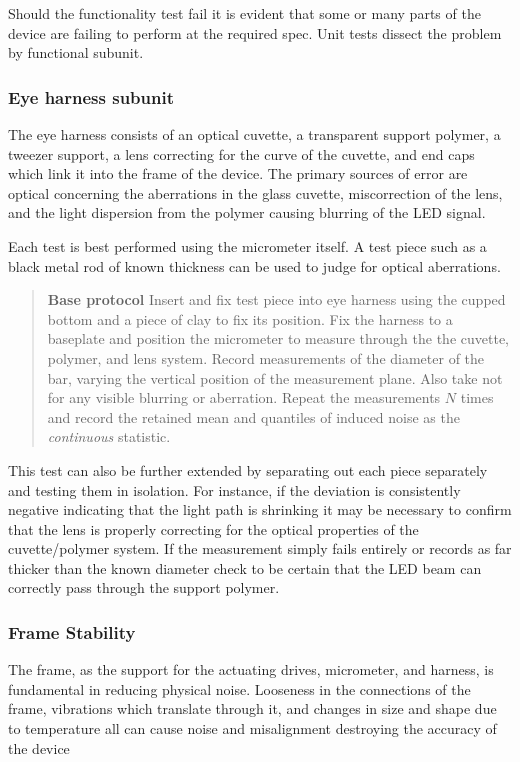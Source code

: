 \documentclass{article}
\begin{document}
Should the functionality test fail it is evident that some or many parts of the device are failing to perform at the required spec. Unit tests dissect the problem by functional subunit.


\subsubsection{Eye harness subunit}
The eye harness consists of an optical cuvette, a transparent support polymer, a tweezer support, a lens correcting for the curve of the cuvette, and end caps which link it into the frame of the device. The primary sources of error are optical concerning the aberrations in the glass cuvette, miscorrection of the lens, and the light dispersion from the polymer causing blurring of the LED signal.

Each test is best performed using the micrometer itself. A test piece such as a black metal rod of known thickness can be used to judge for optical aberrations.

\begin{quotation}
  \textbf{Base protocol} Insert and fix test piece into eye harness   using the cupped bottom and a piece of clay to fix its position. Fix   the harness to a baseplate and position the micrometer to measure   through the the cuvette, polymer, and lens system. Record   measurements of the diameter of the bar, varying the vertical   position of the measurement plane. Also take not for any visible   blurring or aberration. Repeat the measurements $N$ times and record   the retained mean and quantiles of induced noise as the   \textit{continuous} statistic.
\end{quotation}

This test can also be further extended by separating out each piece separately and testing them in isolation. For instance, if the deviation is consistently negative indicating that the light path is shrinking it may be necessary to confirm that the lens is properly correcting for the optical properties of the cuvette/polymer system. If the measurement simply fails entirely or records as far thicker than the known diameter check to be certain that the LED beam can correctly pass through the support polymer.


\subsubsection{Frame Stability}
The frame, as the support for the actuating drives, micrometer, and harness, is fundamental in reducing physical noise. Looseness in the connections of the frame, vibrations which translate through it, and changes in size and shape due to temperature all can cause noise and misalignment destroying the accuracy of the device
\end{document}
